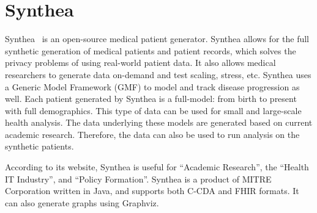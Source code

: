 \section{Synthea}

Synthea~\cite{hid-sp18-526-www-synthea} is an open-source medical patient
generator. Synthea allows for the full synthetic generation of medical patients
and patient records, which solves the privacy problems of using real-world
patient data. It also allows medical researchers to generate data on-demand
and test scaling, stress, etc. Synthea uses a Generic Model Framework (GMF) to
model and track disease progression as well. Each patient generated by Synthea
is a full-model: from birth to present with full demographics. This type of
data can be used for small and large-scale health analysis. The data underlying
these models are generated based on current academic research. Therefore,
the data can also be used to run analysis on the synthetic patients.

According to its website, Synthea is useful for ``Academic Research'', the
``Health IT Industry'', and ``Policy Formation''. Synthea is a product
of MITRE Corporation written in Java, and supports both C-CDA and FHIR
formats. It can also generate graphs using Graphviz.

